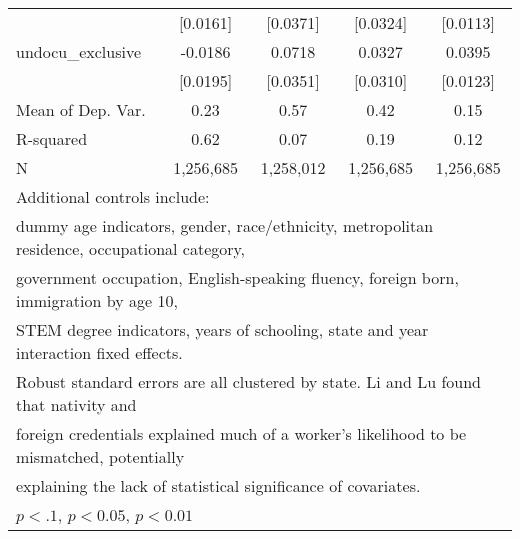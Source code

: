 \begin{table}[htbp]
\begin{tabular}{l*{4}{c}}
                    &    [0.0161]         &    [0.0371]         &    [0.0324]         &    [0.0113]         \\
\addlinespace
undocu\_exclusive    &     -0.0186         &      0.0718\sym{**} &      0.0327         &      0.0395\sym{***}\\
                    &    [0.0195]         &    [0.0351]         &    [0.0310]         &    [0.0123]         \\
\midrule
Mean of Dep. Var.   &        0.23         &        0.57         &        0.42         &        0.15         \\
R-squared           &        0.62         &        0.07         &        0.19         &        0.12         \\
N                   &   1,256,685         &   1,258,012         &   1,256,685         &   1,256,685         \\
\bottomrule
\multicolumn{5}{l}{\footnotesize Additional controls include:}\\
\multicolumn{5}{l}{\footnotesize dummy age indicators, gender, race/ethnicity, metropolitan residence, occupational category,}\\
\multicolumn{5}{l}{\footnotesize government occupation, English-speaking fluency, foreign born, immigration by age 10,}\\
\multicolumn{5}{l}{\footnotesize STEM degree indicators, years of schooling, state and year interaction fixed effects.}\\
\multicolumn{5}{l}{\footnotesize Robust standard errors are all clustered by state. Li and Lu found that nativity and}\\
\multicolumn{5}{l}{\footnotesize foreign credentials explained much of a worker's likelihood to be mismatched, potentially}\\
\multicolumn{5}{l}{\footnotesize explaining the lack of statistical significance of covariates.}\\
\multicolumn{5}{l}{\footnotesize \sym{*} \(p<.1\), \sym{**} \(p<0.05\), \sym{***} \(p<0.01\)}\\
\end{tabular}
\end{table}
